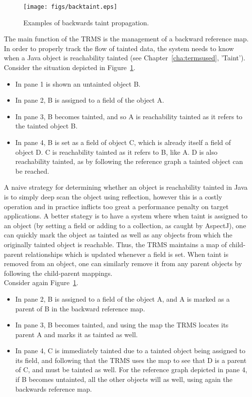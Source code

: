\documentclass[msc,oneside]{ubcthesis}
\begin{document}
\begin{figure}[ht]
  \begin{center}
    \texttt{[image: figs/backtaint.eps]}
    \caption[Examples of backwards taint propagation.]{\label{fig:backtaint} Examples of backwards taint propagation.}
  \end{center}
\end{figure}

The main function of the TRMS is the management of a backward reference map. In order to properly track the flow of tainted data, the system needs to know when a Java object is reachability tainted (see Chapter~\ref{cha:termsused}, 'Taint').\\

Consider the situation depicted in Figure~\ref{fig:backtaint}. 
\begin{itemize}
\item In pane 1 is shown an untainted object B.
\item In pane 2, B is assigned to a field of the object A.
\item In pane 3, B becomes tainted, and so A is reachability tainted as it refers to the tainted object B.
\item In pane 4, B is set as a field of object C, which is already itself a field of object D. C is reachability tainted as it refers to B, like A. D is also reachability tainted, as by following the reference graph a tainted object can be reached. 
\end{itemize}

A naive strategy for determining whether an object is reachability tainted in Java is to simply deep scan the object using reflection, however this is a costly operation and in practice inflicts too great a performance penalty on target applications. A better stategy is to have a system where when taint is assigned to an object (by setting a field or adding to a collection, as caught by AspectJ), one can quickly mark the object as tainted as well as any objects from which the originally tainted object is reachable. Thus, the TRMS maintains a map of child-parent relationships which is updated whenever a field is set. When taint is removed from an object, one can similarly remove it from any parent objects by following the child-parent mappings.\\

Consider again Figure~\ref{fig:backtaint}. 
\begin{itemize}
\item In pane 2, B is assigned to a field of the object A, and A is marked as a parent of B in the backward reference map.
\item In pane 3, B becomes tainted, and using the map the TRMS locates its parent A and marks it as tainted as well.
\item In pane 4, C is immediately tainted due to a tainted object being assigned to its field, and following that the TRMS uses the map to see that D is a parent of C, and must be tainted as well. For the reference graph depicted in pane 4, if B becomes untainted, all the other objects will as well, using again the backwards reference map.
\end{itemize}
\end{document}

